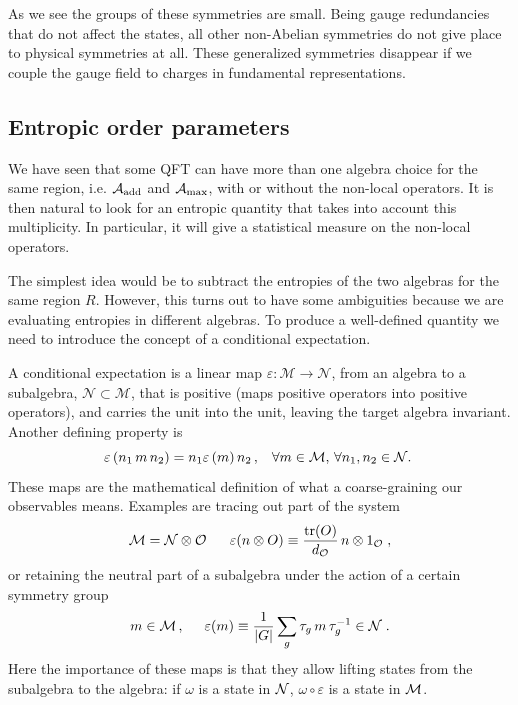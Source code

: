 \documentclass[11pt]{article}
\numberwithin{equation}{section}
\newcommand{\be}{\begin{equation}}
\newcommand{\ee}{\end{equation}}
\begin{document}
As we see the groups of these symmetries are small. Being gauge redundancies that do not affect the states, all other non-Abelian symmetries do not give place to physical symmetries at all. These generalized symmetries disappear if we couple the gauge field to charges in fundamental representations.   


\subsection{Entropic order parameters}

We have seen that some QFT can have more than one algebra choice for the same region, i.e. ${\cal A}_{\textrm{add}}$ and ${\cal A}_{\textrm{max}}$, with or without the non-local operators. It is then natural to look for an entropic quantity that takes into account this multiplicity. In particular, it will give a statistical measure on the non-local operators.   

The simplest idea would be to subtract the entropies of the two algebras for the same region $R$. However, this turns out to have some ambiguities because we are evaluating entropies in different algebras. To produce a well-defined quantity we need to introduce the concept of a conditional expectation. 

A conditional expectation is a linear map $\varepsilon : \mathcal{M}\rightarrow \mathcal{N}$,  from an algebra to a subalgebra, $\mathcal{N}\subset\mathcal{M}$, that is positive (maps positive operators into positive operators), and carries the unit into the unit, leaving the target algebra invariant. Another defining property is
\be
\hspace{-1mm} \varepsilon\left(n_{1}\,m\,n_{2}\right)=n_{1}\varepsilon\left(m\right)n_{2}\,,\hspace{3mm} \forall m\in\mathcal{M},\,\forall n_{1},n_{2}\in\mathcal{N}.\label{ce_def_prop}
\ee
These maps are the mathematical definition of what a coarse-graining  our observables means. Examples are tracing out part of the system
\be 
\mathcal{M}=\mathcal{N}\otimes\mathcal{O}\,\,\,\,\,\,\,\,\,\, \varepsilon(n\otimes O)\equiv \frac{\textrm{tr}(O)}{d_{\cal O}}\, n\otimes 1_{\mathcal{O}}\;,
\ee
or retaining the neutral part of a subalgebra under the action of a certain symmetry group
\be 
m\in \mathcal{M}\,,\hspace{.5cm} \varepsilon(m)\equiv \frac{1}{|G|}\sum\limits_{g}\tau_g \,m\,\tau_{g}^{-1}\in {\cal N}\;.\label{grupo}
\ee
Here the importance of these maps is that they allow lifting states from the subalgebra to the algebra: if $\omega$ is a state in ${\cal N}$, $\omega\circ \varepsilon$ is a state in ${\cal M}$. 
\end{document}
